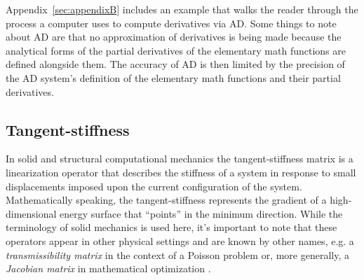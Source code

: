 \documentclass[preprint,12pt]{elsarticle}
\begin{document}
Appendix~\ref{sec:appendixB} includes an example that walks the reader through the process a computer uses to compute derivatives via AD.  Some things to note about AD are that no approximation of derivatives is being made because the analytical forms of the partial derivatives of the elementary math functions are defined alongside them. The accuracy of AD is then limited by the precision of the AD system's definition of the elementary math functions and their partial derivatives.
 
\subsection{Tangent-stiffness} 
\label{subsec:TS}

In solid and structural computational mechanics the tangent-stiffness matrix is a linearization operator that describes the stiffness of a system in response to small displacements imposed upon the current configuration of the system.  Mathematically speaking, the tangent-stiffness represents the gradient of a high-dimensional energy surface that ``points'' in the minimum direction. While the terminology of solid mechanics is used here, it's important to note that these operators appear in other physical settings and are known by other names, e.g. a \emph{transmissibility matrix} in the context of a Poisson problem or, more generally, a \emph{Jacobian matrix} in mathematical optimization \cite{morton2005numerical}.
\end{document}
